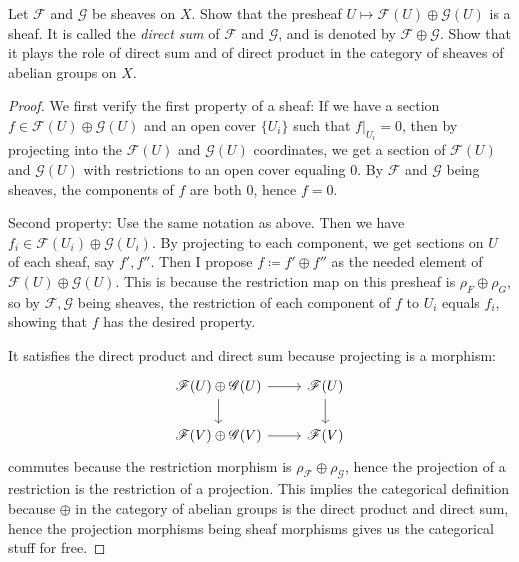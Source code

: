 \begin{exercise}%
	[Direct Sum]
	Let $\mathscr{F} $ and $\mathscr{G} $ be sheaves on $X $. Show that the presheaf $U\mapsto \mathscr{F}(U) \oplus \mathscr{G}(U) $ is a sheaf. It is called the \textit{direct sum} of $\mathscr{F} $ and $\mathscr{G} $, and is denoted by $\mathscr{F}\oplus \mathscr{G} $. Show that it plays the role of direct sum and of direct product in the category of sheaves of abelian groups on $X $.
\end{exercise}
\begin{proof}
	We first verify the first property of a sheaf:
	If we have a section $f \in \mathscr{F}(U) \oplus \mathscr{G}(U)$ and an open cover $\{U_i\}  $ such that $f|_{U_i} = 0 $, then by projecting into the $\mathscr{F}(U) $ and $\mathscr{G}(U) $ coordinates, we get a section of $\mathscr{F}(U) $ and $\mathscr{G}(U) $ with restrictions to an open cover equaling 0.
	By $\mathscr{F} $ and $\mathscr{G} $ being sheaves, the components of $f $ are both 0, hence $f =0$.

	Second property:
	Use the same notation as above.
	Then we have $f_i \in \mathscr{F}(U_i) \oplus \mathscr{G}(U_i) $.
	By projecting to each component, we get sections on $U $ of each sheaf, say $f',f'' $.
	Then I propose $f \coloneqq f' \oplus f''$ as the needed element of $\mathscr{F}(U) \oplus \mathscr{G}(U)$.
	This is because the restriction map on this presheaf is $\rho_{F}\oplus \rho_{G} $, so by $\mathscr{F},\mathscr{G} $ being sheaves, the restriction of each component of $f $ to $U_i $ equals $f_i $, showing that $f $ has the desired property.

	It satisfies the direct product and direct sum because projecting is a morphism:
	\[
	\begin{tikzcd}
	\mathscr{F}(U)\oplus \mathscr{G}(U) & \mathscr{F}(U)\\
	\mathscr{F}(V) \oplus \mathscr{G}(V) & \mathscr{F}(V)
	\arrow[from=1-1,to=1-2]
	\arrow[from=1-1,to=2-1]
	\arrow[from=2-1,to=2-2]
	\arrow[from=1-2,to=2-2]
	\end{tikzcd}
	\]
	commutes because the restriction morphism is $\rho_{\mathscr{F}}\oplus \rho_{\mathscr{G}} $, hence the projection of a restriction is the restriction of a projection.
	This implies the categorical definition because $\oplus  $ in the category of abelian groups is the direct product and direct sum, hence the projection morphisms being sheaf morphisms gives us the categorical stuff for free.
\end{proof}

